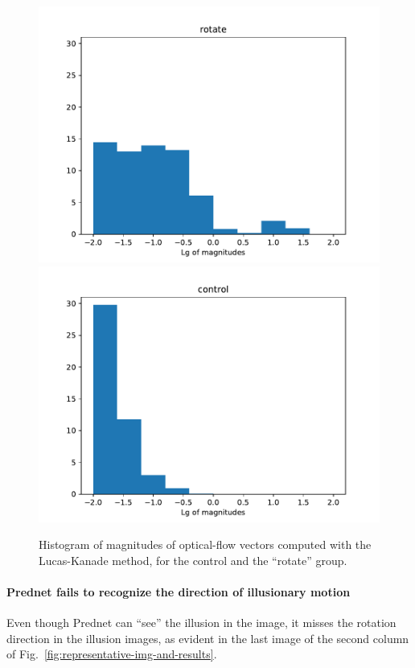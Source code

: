 \documentclass[journal]{IEEEtran}
\begin{document}
  \begin{figure}[t]
    \centering
    \includegraphics[width=\linewidth]{fig/flow-mag-plot-rotate.pdf}
    \includegraphics[width=\linewidth]{fig/flow-mag-plot-control.pdf}
    \caption{Histogram of magnitudes of optical-flow vectors computed with the Lucas-Kanade method, for the control and the ``rotate'' group.}
    \label{fig:histogram-of-magnitudes}
  \end{figure}
  
  \paragraph{Prednet fails to recognize the direction of illusionary motion} Even though Prednet can ``see'' the illusion in the image, it misses the rotation direction in the illusion images, as evident in the last image of the second column of Fig.~\ref{fig:representative-img-and-results}.
  
\end{document}
